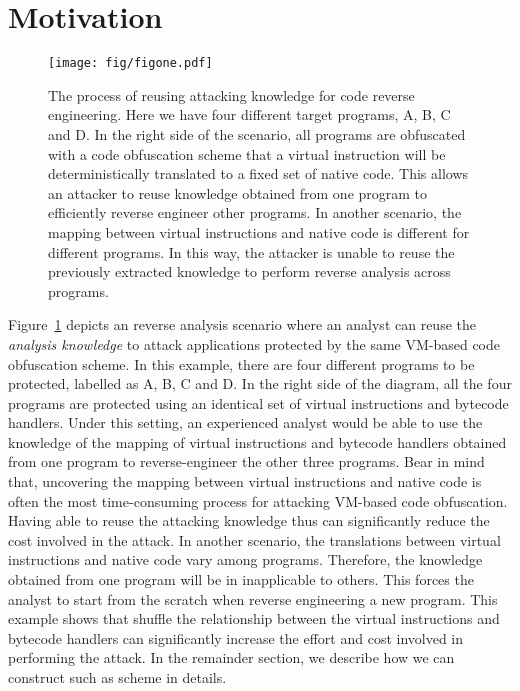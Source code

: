 \section{Motivation}
\label{sec:motivation}
\begin{figure}[!t]
\centering
\texttt{[image: fig/figone.pdf]}
\caption{The process of reusing attacking knowledge for code reverse engineering.
Here we have four different target programs, A, B, C and D.
In the right side of the scenario, all programs are obfuscated with a code obfuscation scheme that a virtual instruction will be deterministically translated to a fixed set of native code.
This allows an attacker to reuse knowledge obtained from one program to efficiently reverse engineer other programs.
In another scenario, the mapping between virtual instructions and native code is different for different programs.
In this way, the attacker is  unable to reuse the previously extracted knowledge to perform reverse analysis across programs.}
\label{fig:one}
\end{figure}

Figure~\ref{fig:one} depicts an reverse analysis scenario where an analyst can
reuse the \textit{analysis knowledge} to attack applications protected by
the same VM-based code obfuscation scheme. In this example, there are four different programs
to be protected, labelled as A, B, C and D. In the right side of the diagram,
all the four programs are protected using an identical set of virtual
instructions and bytecode handlers. Under this setting, an experienced analyst would be able to
use the knowledge of the mapping of virtual instructions and bytecode handlers obtained
from one program to reverse-engineer the other three programs. Bear in mind that,
uncovering the mapping between virtual instructions and native code is often the most
time-consuming process for attacking VM-based code obfuscation. Having able to
reuse the attacking knowledge thus can significantly reduce the cost involved in the
attack.
In another scenario, the translations between virtual instructions and native code
vary among programs. Therefore,  the
knowledge obtained from one program will be in inapplicable to others.
This forces the analyst to start from the scratch when reverse engineering a new program.
This  example shows that shuffle the relationship between the virtual instructions and bytecode handlers
can significantly increase the effort and cost involved in performing the attack.
In the remainder section, we describe how we can construct such as scheme in details.  